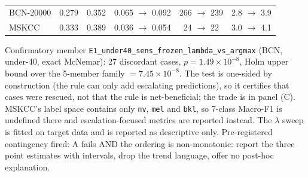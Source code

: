 \begin{table}[t]
\begin{tabular}{lccccc}
BCN-20000 & 0.279 & 0.352 & 0.065 $\rightarrow$ 0.092 & 266 $\rightarrow$ 239 & 2.8 $\rightarrow$ 3.9 \\
MSKCC & 0.333 & 0.389 & 0.036 $\rightarrow$ 0.054 & 24 $\rightarrow$ 22 & 3.0 $\rightarrow$ 4.1 \\
\bottomrule
\end{tabular}
\begin{flushleft}\footnotesize
Confirmatory member \texttt{E1\_under40\_sens\_frozen\_lambda\_vs\_argmax} (BCN, under-40, exact McNemar): 27 discordant cases, $p = 1.49 \times 10^{-8}$, Holm upper bound over the 5-member family $= 7.45 \times 10^{-8}$. The test is one-sided by construction (the rule can only add escalating predictions), so it certifies that cases were rescued, not that the rule is net-beneficial; the trade is in panel (C). MSKCC's label space contains only \texttt{nv}, \texttt{mel} and \texttt{bkl}, so 7-class Macro-F1 is undefined there and escalation-focused metrics are reported instead. The $\lambda$ sweep is fitted on target data and is reported as descriptive only. Pre-registered contingency fired: A fails AND the ordering is non-monotonic: report the three point estimates with intervals, drop the trend language, offer no post-hoc explanation.
\end{flushleft}
\end{table}

